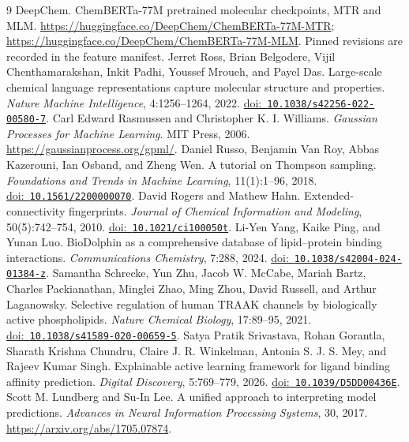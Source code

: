 \documentclass[wcp]{jmlr}
\providecommand{\doi}[1]{\href{https://doi.org/#1}{doi:~\nolinkurl{#1}}}
\begin{document}
\begin{thebibliography}{9}
DeepChem. ChemBERTa-77M pretrained molecular checkpoints, MTR and MLM.
\url{https://huggingface.co/DeepChem/ChemBERTa-77M-MTR};
\url{https://huggingface.co/DeepChem/ChemBERTa-77M-MLM}.
Pinned revisions are recorded in the feature manifest.
Jerret Ross, Brian Belgodere, Vijil Chenthamarakshan, Inkit Padhi,
Youssef Mroueh, and Payel Das.
Large-scale chemical language representations capture molecular structure and properties.
\emph{Nature Machine Intelligence}, 4:1256--1264, 2022.
\doi{10.1038/s42256-022-00580-7}.
Carl Edward Rasmussen and Christopher K. I. Williams.
\emph{Gaussian Processes for Machine Learning}. MIT Press, 2006.
\url{https://gaussianprocess.org/gpml/}.
Daniel Russo, Benjamin Van Roy, Abbas Kazerouni, Ian Osband, and Zheng Wen.
A tutorial on Thompson sampling.
\emph{Foundations and Trends in Machine Learning}, 11(1):1--96, 2018.
\doi{10.1561/2200000070}.
David Rogers and Mathew Hahn.
Extended-connectivity fingerprints.
\emph{Journal of Chemical Information and Modeling}, 50(5):742--754, 2010.
\doi{10.1021/ci100050t}.
Li-Yen Yang, Kaike Ping, and Yunan Luo.
BioDolphin as a comprehensive database of lipid--protein binding interactions.
\emph{Communications Chemistry}, 7:288, 2024.
\doi{10.1038/s42004-024-01384-z}.
Samantha Schrecke, Yun Zhu, Jacob W. McCabe, Mariah Bartz, Charles Packianathan,
Minglei Zhao, Ming Zhou, David Russell, and Arthur Laganowsky.
Selective regulation of human TRAAK channels by biologically active phospholipids.
\emph{Nature Chemical Biology}, 17:89--95, 2021.
\doi{10.1038/s41589-020-00659-5}.
Satya Pratik Srivastava, Rohan Gorantla, Sharath Krishna Chundru,
Claire J. R. Winkelman, Antonia S. J. S. Mey, and Rajeev Kumar Singh.
Explainable active learning framework for ligand binding affinity prediction.
\emph{Digital Discovery}, 5:769--779, 2026.
\doi{10.1039/D5DD00436E}.
Scott M. Lundberg and Su-In Lee.
A unified approach to interpreting model predictions.
\emph{Advances in Neural Information Processing Systems}, 30, 2017.
\url{https://arxiv.org/abs/1705.07874}.
\end{thebibliography}
\end{document}
